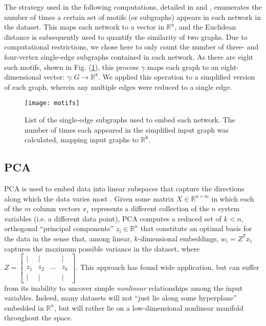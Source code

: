   The strategy used in the following computations, detailed in
  \cite{rajendran_analysis_2013} and \cite{xiao_structure-based_2008},
  enumerates the number of times a certain set of motifs (or
  subgraphs) appears in each network in the dataset.
  This maps each network to a vector in $\mathbb{R}^n$, and the
  Euclidean distance is subsequently used to quantify the similarity
  of two graphs.
  Due to computational restrictions, we chose here to only count the
  number of three- and four-vertex single-edge subgraphs contained in
  each network.
  As there are eight such motifs, shown in Fig. (\ref{fig:motifs}),
  this process $\gamma$ maps each graph to an eight-dimensional
  vector: $\gamma : G \rightarrow \mathbb{R}^8$.
  We applied this operation to a simplified version of each graph,
  wherein any multiple edges were reduced to a single edge.

  \begin{figure}
    \vspace{-5mm} \centering
    \texttt{[image: motifs]}
    \caption[List of subgraphs used to embed multigraphs]{List of the
      single-edge subgraphs used to embed each network.  The number of
      times each appeared in the simplified input graph was
      calculated, mapping input graphs to
      $\mathbb{R}^8$. \label{fig:motifs}}
  \end{figure}

  \subsection{PCA\label{sec:pca}}
  

  PCA is used to embed data into linear subspaces that capture the
  directions along which the data varies most
  \cite{jolliffe_principal_2014}.
  Given some matrix $X \in \mathbb{R}^{n \times m}$ in which each of
  the $m$ column vectors $x_i$ represents a different collection of
  the $n$ system variables (i.e. a different data point), PCA computes
  a reduced set of $k<n$, orthogonal ``principal components''
  $z_i \in \mathbb{R}^n$ that constitute an optimal basis for the data
  in the sense that, among linear, $k$-dimensional embeddings,
  $w_i = Z^Tx_i$ captures the maximum possible variance in the
  dataset, where
  $Z = \begin{bmatrix} | & | & & | \\ z_1 & z_2 & \hdots & z_k \\ | &
    | & & | \end{bmatrix}$.
  This approach has found wide application, but can suffer from its
  inability to uncover simple \textit{nonlinear} relationships among
  the input variables.
  Indeed, many datasets will not ``just lie along some hyperplane''
  embedded in $\mathbb{R}^n$, but will rather lie on a low-dimensional
  nonlinear manifold throughout the space.

